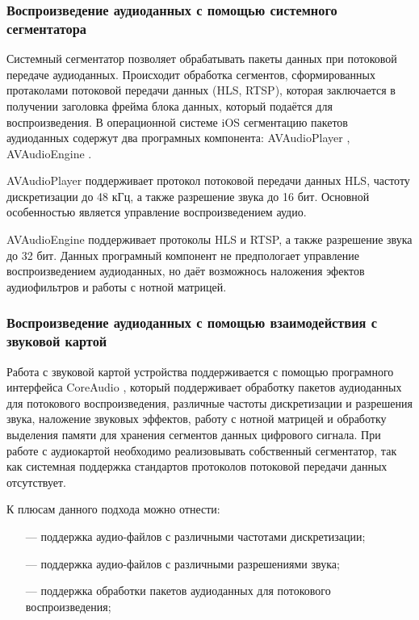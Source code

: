 	\subsubsection{Воспроизведение аудиоданных с помощью системного сегментатора}
		\par Системный сегментатор позволяет обрабатывать пакеты данных при потоковой передаче аудиоданных.
		Происходит обработка сегментов, сформированных протаколами потоковой передачи данных (HLS, RTSP),
		которая заключается в получении заголовка фрейма блока данных, который подаётся для воспроизведения.
		В операционной системе iOS сегментацию пакетов аудиоданных содержут два програмных компонента: AVAudioPlayer \cite{avplayer}, AVAudioEngine \cite{avengine}.
		
		\par AVAudioPlayer поддерживает протокол потоковой передачи данных HLS, частоту дискретизации до 48 кГц, а также разрешение звука до 16 бит.
		Основной особенностью является управление воспроизведением аудио.
		
		AVAudioEngine поддерживает протоколы HLS и RTSP, а также разрешение звука до 32 бит.
		Данных програмный компонент не предпологает управление воспроизведением аудиоданных, но даёт возможнось наложения эфектов аудиофильтров и работы с нотной матрицей.

	\subsubsection{Воспроизведение аудиоданных с помощью взаимодействия с звуковой картой}
		\par Работа с звуковой картой устройства поддерживается с помощью програмного интерфейса CoreAudio \cite{coreaudio},
		который поддерживает обработку пакетов аудиоданных для потокового воспроизведения, различные частоты дискретизации и разрешения звука, наложение звуковых эффектов,
		работу с нотной матрицей и обработку выделения памяти для хранения сегментов данных цифрового сигнала.
		При работе с аудиокартой необходимо реализовывать собственный сегментатор, так как системная поддержка стандартов протоколов потоковой передачи данных отсутствует.
		
		\par К плюсам данного подхода можно отнести:
		\begin{itemize}
			\item[---] поддержка аудио-файлов с различными частотами дискретизации;
			\item[---] поддержка аудио-файлов с различными разрешениями звука;
			\item[---] поддержка обработки пакетов аудиоданных для потокового воспроизведения; 
		\end{itemize}

